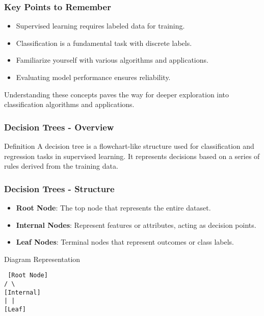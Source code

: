 \documentclass[aspectratio=169]{beamer}
\begin{document}
\begin{frame}[fragile]
    \frametitle{Key Points to Remember}
    \begin{itemize}
        \item Supervised learning requires labeled data for training.
        \item Classification is a fundamental task with discrete labels.
        \item Familiarize yourself with various algorithms and applications.
        \item Evaluating model performance ensures reliability.
    \end{itemize}
    Understanding these concepts paves the way for deeper exploration into classification algorithms and applications.
\end{frame}

\begin{frame}[fragile]
    \frametitle{Decision Trees - Overview}
    \begin{block}{Definition}
        A decision tree is a flowchart-like structure used for classification and regression tasks in supervised learning. It represents decisions based on a series of rules derived from the training data.
    \end{block}
\end{frame}

\begin{frame}[fragile]
    \frametitle{Decision Trees - Structure}
    \begin{itemize}
        \item \textbf{Root Node}: The top node that represents the entire dataset.
        \item \textbf{Internal Nodes}: Represent features or attributes, acting as decision points.
        \item \textbf{Leaf Nodes}: Terminal nodes that represent outcomes or class labels.
    \end{itemize}
    
    \begin{block}{Diagram Representation}
        \begin{center}
            \texttt{
                [Root Node] \\
                /      \textbackslash \\
            [Internal]  [Internal] \\
                |          | \\
            [Leaf]     [Leaf]
            }
        \end{center}
    \end{block}
\end{frame}
\end{document}
